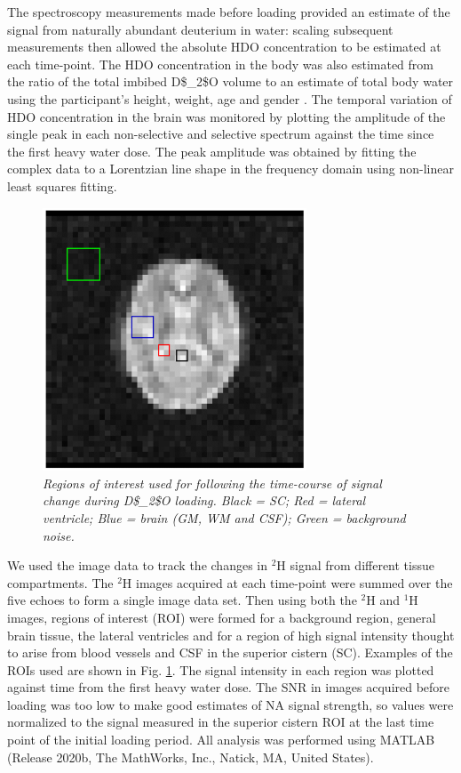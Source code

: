 The spectroscopy measurements made before loading provided an estimate of the signal from naturally abundant deuterium in water: scaling subsequent measurements then allowed the absolute \ac{HDO} concentration to be estimated at each time-point. The \ac{HDO} concentration in the body was also estimated from the ratio of the total imbibed \ac{D$_2$O} volume to an estimate of total body water using the participant’s height, weight, age and gender \cite{Watson1980TotalMeasurements}. The temporal variation of \ac{HDO} concentration in the brain was monitored by plotting the amplitude of the single peak in each non-selective and selective spectrum against the time since the first heavy water dose. The peak amplitude was obtained by fitting the complex data to a Lorentzian line shape in the frequency domain using non-linear least squares fitting. 

\begin{figure}[H]
    \centering
    \includegraphics[width=0.7\textwidth]{Figures/D2O/ROI.png}
    \caption{\textit{Regions of interest used for following the time-course of signal change during \ac{D$_2$O} loading. Black = \ac{SC}; Red = lateral ventricle; Blue = brain (\ac{GM}, \ac{WM} and \ac{CSF}); Green = background noise.}}
    \label{fig:D2O:ROI}
\end{figure}

We used the image data to track the changes in $^2$H signal from different tissue compartments. The $^2$H images acquired at each time-point were summed over the five echoes to form a single image data set. Then using both the $^2$H and $^1$H images, regions of interest (ROI) were formed for a background region, general brain tissue, the lateral ventricles and for a region of high signal intensity thought to arise from blood vessels and \ac{CSF} in the superior cistern (SC). Examples of the \ac{ROI}s used are shown in Fig. \ref{fig:D2O:ROI}. The signal intensity in each region was plotted against time from the first heavy water dose. The \ac{SNR} in images acquired before loading was too low to make good estimates of \ac{NA} signal strength, so values were normalized to the signal measured in the superior cistern \ac{ROI} at the last time point of the initial loading period. All analysis was performed using MATLAB (Release 2020b, The MathWorks, Inc., Natick, MA, United States).

